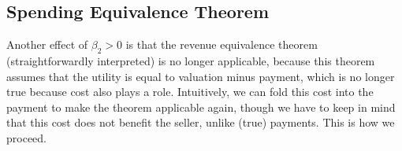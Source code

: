 \subsection{Spending Equivalence Theorem}

Another effect of $\beta_2>0$ is that the revenue equivalence theorem
(straightforwardly interpreted) is no longer applicable, because this theorem 
assumes
that the utility is equal to valuation minus payment, which is no longer
true because cost also plays a role.  Intuitively, we can fold this cost
into the payment to make the theorem applicable again, though we have to
keep in mind that this cost does not benefit the seller, unlike (true)
payments.  This is how we proceed.





